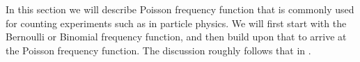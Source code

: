 In this section we will describe Poisson frequency function that is commonly used for counting experiments such as in particle physics. We will first start with the Bernoulli or Binomial frequency function, and then build upon that to arrive at the Poisson frequency function. The discussion roughly follows that in \citep{Melissinos}.
